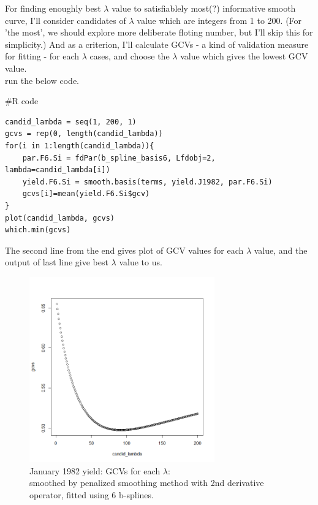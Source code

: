 \documentclass{article}
\newenvironment{Rcode}%
{%
    \begin{mdframed}
    \#R code
    \begin{small}
}
{%
    \end{small}
    \end{mdframed}
}
\begin{document}
For finding enoughly best $\lambda$ value to satisfiablely most(?) informative smooth curve,
I'll consider candidates of $\lambda$ value which are integers from 1 to 200. 
(For 'the most', we should explore more deliberate floting number, but I'll skip this for simplicity.)
And as a criterion, I'll calculate GCVs - a kind of validation measure for fitting - for each $\lambda$ cases,
and choose the $\lambda$ value which gives the lowest GCV value. \\
run the below code.
\begin{Rcode}
    \begin{verbatim}
candid_lambda = seq(1, 200, 1)
gcvs = rep(0, length(candid_lambda))
for(i in 1:length(candid_lambda)){
    par.F6.Si = fdPar(b_spline_basis6, Lfdobj=2, lambda=candid_lambda[i])
    yield.F6.Si = smooth.basis(terms, yield.J1982, par.F6.Si)
    gcvs[i]=mean(yield.F6.Si$gcv)
}
plot(candid_lambda, gcvs)
which.min(gcvs)
    \end{verbatim}
\end{Rcode}
The second line from the end gives plot of GCV values for each $\lambda$ value, and
the output of last line give best $\lambda$ value to us.

\begin{figure}[hh]
    \centering
    \includegraphics[height=8cm]{1982Jyield_bspline6_lambda_gcv.png}
    \caption{January 1982 yield: GCVs for each $\lambda$:\\ smoothed by penalized smoothing method with 2nd derivative operator, fitted using 6 b-splines.}
\end{figure}
\end{document}
